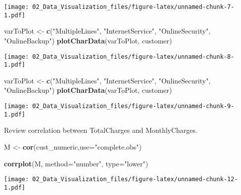 \documentclass[]{article}
\newenvironment{Shaded}{\begin{snugshade}}{\end{snugshade}}
\newcommand{\DataTypeTok}[1]{\textcolor[rgb]{0.13,0.29,0.53}{#1}}
\newcommand{\KeywordTok}[1]{\textcolor[rgb]{0.13,0.29,0.53}{\textbf{#1}}}
\newcommand{\NormalTok}[1]{#1}
\newcommand{\OperatorTok}[1]{\textcolor[rgb]{0.81,0.36,0.00}{\textbf{#1}}}
\newcommand{\StringTok}[1]{\textcolor[rgb]{0.31,0.60,0.02}{#1}}
\begin{document}
\texttt{[image: 02\_Data\_Visualization\_files/figure-latex/unnamed-chunk-7-1.pdf]}

\begin{Shaded}
\begin{Highlighting}[]
\NormalTok{varToPlot <-}\StringTok{ }\KeywordTok{c}\NormalTok{(}\StringTok{"MultipleLines"}\NormalTok{, }\StringTok{"InternetService"}\NormalTok{, }\StringTok{"OnlineSecurity"}\NormalTok{, }\StringTok{"OnlineBackup"}\NormalTok{)}
\KeywordTok{plotCharData}\NormalTok{(varToPlot, customer)}
\end{Highlighting}
\end{Shaded}

\texttt{[image: 02\_Data\_Visualization\_files/figure-latex/unnamed-chunk-8-1.pdf]}

\begin{Shaded}
\begin{Highlighting}[]
\NormalTok{varToPlot <-}\StringTok{ }\KeywordTok{c}\NormalTok{(}\StringTok{"MultipleLines"}\NormalTok{, }\StringTok{"InternetService"}\NormalTok{, }\StringTok{"OnlineSecurity"}\NormalTok{, }\StringTok{"OnlineBackup"}\NormalTok{)}
\KeywordTok{plotCharData}\NormalTok{(varToPlot, customer)}
\end{Highlighting}
\end{Shaded}

\texttt{[image: 02\_Data\_Visualization\_files/figure-latex/unnamed-chunk-9-1.pdf]}

Review correlation between TotalCharges and MonthlyCharges.

\begin{Shaded}
\end{Shaded}

\begin{Shaded}
\begin{Highlighting}[]
\NormalTok{M <-}\StringTok{ }\KeywordTok{cor}\NormalTok{(cust_numeric,}\DataTypeTok{use=}\StringTok{"complete.obs"}\NormalTok{)}
\end{Highlighting}
\end{Shaded}

\begin{Shaded}
\begin{Highlighting}[]
\KeywordTok{corrplot}\NormalTok{(M, }\DataTypeTok{method=}\StringTok{"number"}\NormalTok{, }\DataTypeTok{type=}\StringTok{"lower"}\NormalTok{)}
\end{Highlighting}
\end{Shaded}

\texttt{[image: 02\_Data\_Visualization\_files/figure-latex/unnamed-chunk-12-1.pdf]}
\end{document}
